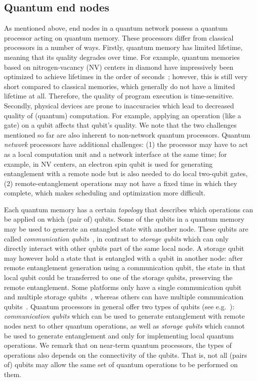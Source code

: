 \subsection{Quantum end nodes}
As mentioned above, end nodes in a quantum network possess a quantum processor acting on quantum memory.
These processors differ from classical processors in a number of ways.
Firstly, quantum memory has limited lifetime, meaning that its quality degrades over time.
For example, quantum memories based on nitrogen-vacancy (NV) centers in diamond have impressively been optimized to achieve lifetimes in the order of seconds~\cite{Abobeih2018};
however, this is still very short compared to classical memories, which generally do not have a limited lifetime at all.
Therefore, the quality of program execution is time-sensitive.
Secondly, physical devices are prone to inaccuracies which lead to decreased quality of (quantum) computation.
For example, applying an operation (like a gate) on a qubit affects that qubit's quality.
We note that the two challenges mentioned so far are also inherent to non-network quantum processors.
Quantum \textit{network} processors have additional challenges:
    (1) the processor may have to act as a local computation unit and a network interface at the same time;
    for example, in NV centers, an electron spin qubit is used for generating entanglement with a remote node but is also needed to do local two-qubit gates,
    (2) remote-entanglement operations may not have a fixed time in which they complete, which makes scheduling and optimization more difficult.

Each quantum memory has a certain \textit{topology} that describes which operations can be applied on which (pair of) qubits.
Some of the qubits in a quantum memory may be used to generate an entangled state with another node.
These qubits are called \emph{communication qubits}~\cite{dahlberg2019linklayer}, in contrast to \emph{storage qubits} which can only directly interact with other qubits part of the same local node.
A storage qubit may however hold a state that is entangled with a qubit in another node: after remote entanglement generation using a communication qubit, the state in that local qubit could be transferred to one of the storage qubits, preserving the remote entanglement.
Some platforms only have a single communication qubit and multiple storage qubits~\cite{Bernien2014}, whereas others can have multiple communication qubits~\cite{Inlek2017}.
Quantum processors in general offer two types of qubits (see e.g.~\cite{dahlberg_2019_egp}): \emph{communication qubits} which can be used to generate entanglement with remote nodes next to other quantum operations, as well as \emph{storage qubits} which cannot be used to generate entanglement and only for implementing local quantum operations.
We remark that on near-term quantum processors, the types of operations also depends on the connectivity of the qubits.
That is, not all (pairs of) qubits may allow the same set of quantum operations to be performed on them.

